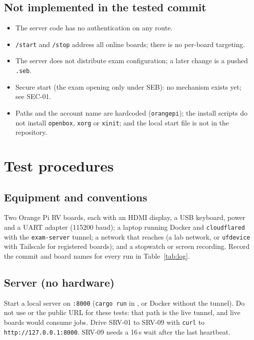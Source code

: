 \documentclass[11pt]{article}
\begin{document}
\subsection{Not implemented in the tested commit}

\begin{itemize}\setlength{\itemsep}{0.12em}
  \item The server code has no authentication on any route.
  \item \texttt{/start} and \texttt{/stop} address all online boards; there is no per-board targeting.
  \item The server does not distribute exam configuration; a later change is a pushed \texttt{.seb}.
  \item Secure start (the exam opening only under SEB): no mechanism exists yet; see SEC-01.
  \item Paths and the account name are hardcoded (\texttt{orangepi}); the install scripts do not install \texttt{openbox}, \texttt{xorg} or \texttt{xinit}; and the local start file is not in the repository.
\end{itemize}

\section{Test procedures}
\label{sec:proc}

\subsection{Equipment and conventions}

Two Orange Pi RV boards, each with an HDMI display, a USB keyboard, power and a UART adapter (115200 baud); a laptop running Docker and \texttt{cloudflared} with the \texttt{exam-server} tunnel; a network that reaches  (a lab network, or \texttt{ufdevice} with Tailscale for registered boards); and a stopwatch or screen recording. Record the commit and board names for every run in Table~\ref{tab:log}.

\subsection{Server (no hardware)}

Start a local server on \texttt{:8000} (\texttt{cargo run} in , or Docker without the tunnel). Do not use  or the public URL for these tests: that path is the live tunnel, and live boards would consume jobs. Drive SRV-01 to SRV-09 with \texttt{curl} to \texttt{http://127.0.0.1:8000}. SRV-09 needs a 16\,s wait after the last heartbeat.
\end{document}
